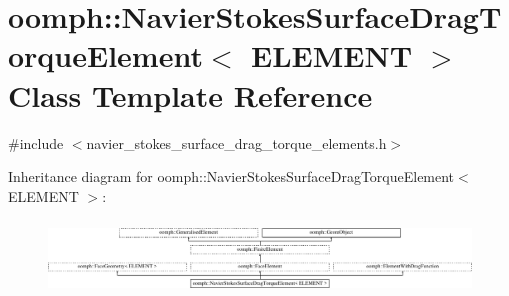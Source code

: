 \hypertarget{classoomph_1_1NavierStokesSurfaceDragTorqueElement}{}\section{oomph\+:\+:Navier\+Stokes\+Surface\+Drag\+Torque\+Element$<$ E\+L\+E\+M\+E\+NT $>$ Class Template Reference}
\label{classoomph_1_1NavierStokesSurfaceDragTorqueElement}


{\ttfamily \#include $<$navier\+\_\+stokes\+\_\+surface\+\_\+drag\+\_\+torque\+\_\+elements.\+h$>$}

Inheritance diagram for oomph\+:\+:Navier\+Stokes\+Surface\+Drag\+Torque\+Element$<$ E\+L\+E\+M\+E\+NT $>$\+:\begin{figure}[H]
\begin{center}
\leavevmode
\includegraphics[height=1.985816cm]{classoomph_1_1NavierStokesSurfaceDragTorqueElement}
\end{center}
\end{figure}
